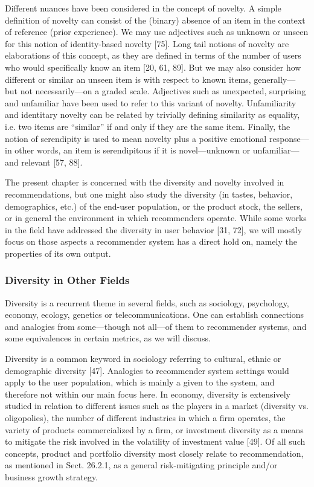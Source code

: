Different nuances have been considered in the concept of novelty. A simple definition of novelty can consist of the (binary) absence of an item in the context of reference (prior experience). We may use adjectives such as unknown or unseen for this notion of identity-based novelty [75]. Long tail notions of novelty are elaborations of this concept, as they are defined in terms of the number of users who would specifically know an item [20, 61, 89]. But we may also consider how different or similar an unseen item is with respect to known items, generally— but not necessarily—on a graded scale. Adjectives such as unexpected, surprising and unfamiliar have been used to refer to this variant of novelty. Unfamiliarity and identitary novelty can be related by trivially defining similarity as equality, i.e. two items are “similar” if and only if they are the same item. Finally, the notion of serendipity is used to mean novelty plus a positive emotional response— in other words, an item is serendipitous if it is novel—unknown or unfamiliar—and relevant [57, 88].

The present chapter is concerned with the diversity and novelty involved in recommendations, but one might also study the diversity (in tastes, behavior, demographics, etc.) of the end-user population, or the product stock, the sellers, or in general the environment in which recommenders operate. While some works in the field have addressed the diversity in user behavior [31, 72], we will mostly focus on those aspects a recommender system has a direct hold on, namely the properties of its own output.

\subsubsection{Diversity in Other Fields}

Diversity is a recurrent theme in several fields, such as sociology, psychology, economy, ecology, genetics or telecommunications. One can establish connections and analogies from some—though not all—of them to recommender systems, and some equivalences in certain metrics, as we will discuss.

Diversity is a common keyword in sociology referring to cultural, ethnic or demographic diversity [47]. Analogies to recommender system settings would apply to the user population, which is mainly a given to the system, and therefore not within our main focus here. In economy, diversity is extensively studied in relation to different issues such as the players in a market (diversity vs. oligopolies), the number of different industries in which a firm operates, the variety of products commercialized by a firm, or investment diversity as a means to mitigate the risk involved in the volatility of investment value [49]. Of all such concepts, product and portfolio diversity most closely relate to recommendation, as mentioned in Sect. 26.2.1, as a general risk-mitigating principle and/or business growth strategy.

